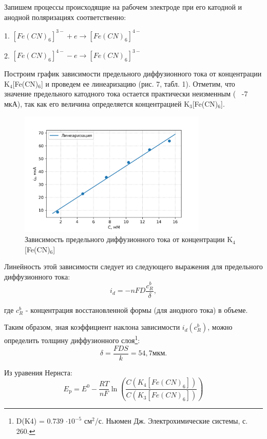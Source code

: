 \documentclass[a4paper, 12pt]{article}
\begin{document}
Запишем процессы происходящие на рабочем электроде при его катодной и анодной поляризациях соответственно:

1. $\left[F e(C N)_{6}\right]^{3-}+e \rightarrow\left[F e(C N)_{6}\right]^{4-}$

2. $\left[F e(C N)_{6}\right]^{4-}-e \rightarrow\left[F e(C N)_{6}\right]^{3-}$

Построим график зависимости предельного диффузионного тока от концентрации K$_4$[Fe(CN)$_6$] и проведем ее линеаризацию (рис. 7, табл. 1). Отметим, что значение предельного катодного тока остается практически неизменным (~ -7 мкА), так как его величина определяется концентрацией K$_3$[Fe(CN)$_6$]. 

\begin{figure}[h!]
    \begin{center}
    \includegraphics[width=0.8\textwidth]{I.png}
    \end{center}
    \caption{Зависимость предельного диффузионного тока от концентрации K$_4$[Fe(CN)$_6$]}
\end{figure}

Линейность этой зависимости следует из следующего выражения для предельного диффузионного тока:
$$i_{d}=-n F D \frac{c_{R}^{b}}{\delta},$$

где $c_{R}^{b}$ - концентрация восстановленной формы (для анодного тока) в объеме.

Таким образом, зная коэффициент наклона зависимости $i_{d}(c_{R}^{b})$, можно определить толщину диффузионного слоя\footnote{D(K4) =  0.739 $\cdot 10^{-5}$ см$^2$/с. Ньюмен Дж. Электрохимические системы, с. 260.}:
$$
\delta=\frac{F D  S}{k}= 54,7 \text{мкм}.
$$

Из уравения Нернста:
$$
E_{\mathrm{p}}=E^{0}-\frac{R T}{n F} \ln \left(\frac{C\left(K_{4}\left[F e(C N)_{6}\right]\right)}{C\left(K_{3}\left[F e(C N)_{6}\right]\right)}\right)
$$
\end{document}
